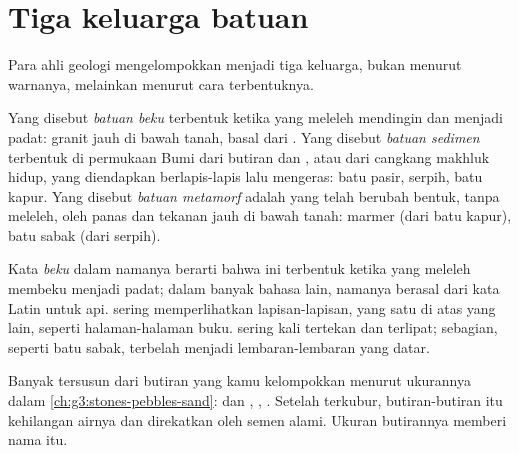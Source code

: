 \section{Tiga keluarga batuan}

Para ahli geologi mengelompokkan  menjadi tiga keluarga, bukan menurut
warnanya, melainkan menurut cara terbentuknya.

\begin{definition}\label{def:g6:rocks-and-minerals:rock-families}
Yang disebut \emph{batuan beku} terbentuk ketika 
yang meleleh mendingin dan menjadi padat: granit jauh di bawah tanah, basal
dari . Yang disebut \emph{batuan sedimen}
terbentuk di permukaan Bumi dari butiran  dan , atau dari
cangkang makhluk hidup, yang diendapkan berlapis-lapis lalu mengeras: batu
pasir, serpih, batu kapur. Yang disebut
\emph{batuan metamorf} adalah  yang telah
berubah bentuk, tanpa meleleh, oleh panas dan tekanan jauh di bawah tanah:
marmer (dari batu kapur), batu sabak (dari serpih).
\end{definition}

Kata \emph{beku} dalam namanya berarti bahwa  ini terbentuk ketika
 yang meleleh membeku menjadi padat; dalam banyak bahasa lain, namanya
berasal dari kata Latin untuk api.  sering memperlihatkan lapisan-lapisan,
yang satu di atas yang lain, seperti halaman-halaman buku. 
sering kali tertekan dan terlipat; sebagian, seperti batu sabak, terbelah
menjadi lembaran-lembaran yang datar.

Banyak  tersusun dari butiran yang kamu kelompokkan menurut
ukurannya dalam \cref{ch:g3:stones-pebbles-sand}:  dan ,
, . Setelah terkubur, butiran-butiran itu kehilangan airnya dan
direkatkan oleh semen alami. Ukuran butirannya memberi nama  itu.


